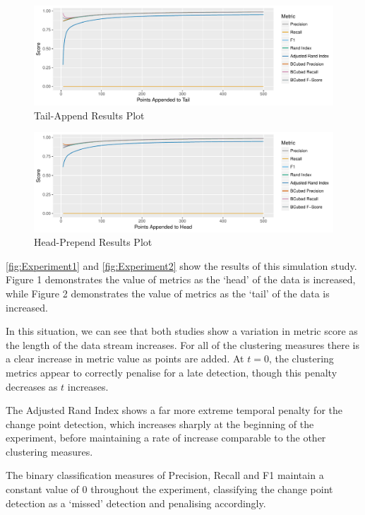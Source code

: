 \documentclass{uvamscse}	%
\begin{document}
\begin{figure}[h]
    \includegraphics[width=\textwidth]{figures/Experiment1}
    \caption{Tail-Append Results Plot}
    \label{fig:Experiment1}
\end{figure}

\begin{figure}[h]
    \includegraphics[width=\textwidth]{figures/Experiment4}
    \caption{Head-Prepend Results Plot}
    \label{fig:Experiment2}
\end{figure}

\autoref{fig:Experiment1} and \autoref{fig:Experiment2} show the results of this simulation study. Figure 1 demonstrates the value of metrics as the `head' of the data is increased, while Figure 2 demonstrates the value of metrics as the `tail' of the data is increased.

In this situation, we can see that both studies show a variation in metric score as the length of the data stream increases. For all of the clustering measures there is a clear increase in metric value as points are added. At $t=0$, the clustering metrics appear to correctly penalise for a late detection, though this penalty decreases as $t$ increases.

The Adjusted Rand Index shows a far more extreme temporal penalty for the change point detection, which increases sharply at the beginning of the experiment, before maintaining a rate of increase comparable to the other clustering measures.

The binary classification measures of Precision, Recall and F1 maintain a constant value of $0$ throughout the experiment, classifying the change point detection as a `missed' detection and penalising accordingly.
\end{document}
